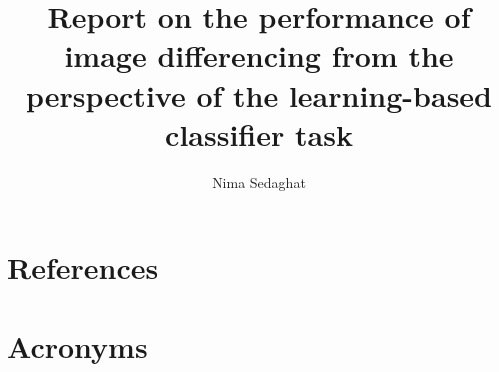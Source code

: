 \documentclass[DM,authoryear,toc]{lsstdoc}
\title{Report on the performance of image differencing from the perspective of the learning-based classifier task}
\author{%
Nima Sedaghat
}
\date{\vcsDate}
\begin{document}
\maketitle


\appendix
\section{References} \label{sec:bib}
\renewcommand{\refname}{} %


\section{Acronyms} \label{sec:acronyms}

\end{document}
